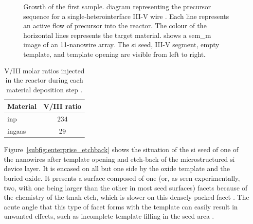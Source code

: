 \begin{figure}
{
    }
    \caption[Precursor sequence and \acs{sem_m} image of sample 1.]{Growth of the first sample.  diagram representing the precursor sequence for a single-heterointerface III-V wire \cite{Brugnolotto2023}. Each line represents an active flow of precursor into the reactor. The colour of the horizontal lines represents the target material.  shows a \acs{sem_m} image of an \num{11}-nanowire array. The \acs{si} seed, III-V segment, empty template, and template opening are visible from left to right.}
    \label{fig:sample1_growth}
\end{figure}

\begin{table}
    \centering
    \caption[V/III molar ratios injected in the reactor during each material deposition step.]{V/III molar ratios injected in the reactor during each material deposition step \cite{Brugnolotto2023_2}.}
    \begin{tabular}{l|c}
        Material & V/III ratio \\ \hline \hline
        \acs{inp}  & 234\\
        \acs{ingaas}     & 29\\ \hline
    \end{tabular}
    \label{tab:sample1_ratios}
\end{table}

Figure~\ref{subfig:enterprise_etchback} shows the situation of the \acl{si} seed of one of the nanowires after template opening and etch-back of the microstructured \acl{si} device layer. It is encased on all but one side by the oxide template and the buried oxide. It presents a surface composed of one (or, as seen experimentally, two, with one being larger than the other in most seed surfaces)  facets because of the chemistry of the \acs{tmah} etch, which is slower on this densely-packed facet \cite{Zubel2012}. The acute angle that this type of facet forms with the template can easily result in unwanted effects, such as incomplete template filling in the seed area \cite{Scherrer2022}. 

